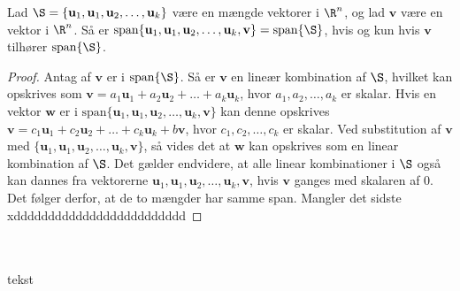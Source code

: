 \begin{thm}{}{}
%
Lad $\S =  \{\mathbf{u}_1,\mathbf{u}_1, \mathbf{u}_2 , \ldots , \mathbf{u}_k \}$ være en mængde vektorer i $\R^n$, og lad $\mathbf{v}$ være en vektor i $\R^n$.
Så er $\text{span}\{ \mathbf{u}_1,\mathbf{u}_1, \mathbf{u}_2 , \ldots , \mathbf{u}_k , \mathbf{v}\} =\text{span}\{\S\}$, hvis og kun hvis $\mathbf{v}$ tilhører $\text{span}\{\S\}$.
%
\end{thm}
%
%
\begin{proof}
%
Antag af $\mathbf{v}$ er i $\text{span}\{\S\}$. Så er $\mathbf{v}$ en lineær kombination af $\S$, hvilket kan opskrives som $\mathbf{v}=a_1\mathbf{u}_1+a_2\mathbf{u}_2+ \ldots + a_k\mathbf{u}_k$, hvor $a_1,a_2,\ldots, a_k$ er skalar. 
Hvis en vektor $\mathbf{w}$ er i $\text{span}\{ \mathbf{u}_1,\mathbf{u}_1, \mathbf{u}_2 , \ldots , \mathbf{u}_k , \mathbf{v}\}$ kan denne opskrives $\mathbf{v}=c_1\mathbf{u}_1+c_2\mathbf{u}_2+ \ldots + c_k\mathbf{u}_k+b\mathbf{v}$, hvor $c_1,c_2,\ldots, c_k$ er skalar.
Ved substitution af $\mathbf{v}$ med $\{ \mathbf{u}_1,\mathbf{u}_1, \mathbf{u}_2 , \ldots , \mathbf{u}_k , \mathbf{v}\}$, så vides det at $\mathbf{w}$ kan opskrives som en linear kombination af $\S$. 
Det gælder endvidere, at alle linear kombinationer i $\S$ også kan dannes fra vektorerne $\mathbf{u}_1,\mathbf{u}_1, \mathbf{u}_2 , \ldots , \mathbf{u}_k , \mathbf{v}$, hvis $\mathbf{v}$ ganges med skalaren af $0$.
Det følger derfor, at de to mængder har samme span. 
Mangler det sidste xddddddddddddddddddddddddd
%
\end{proof}
\\\\
%
tekst 
%
































